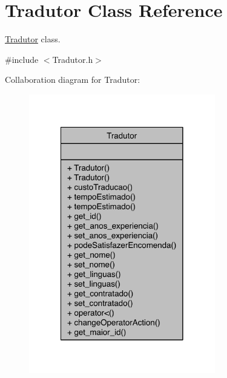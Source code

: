 \hypertarget{class_tradutor}{\section{Tradutor Class Reference}
\label{class_tradutor}
}


\hyperlink{class_tradutor}{Tradutor} class.  




{\ttfamily \#include $<$Tradutor.\-h$>$}



Collaboration diagram for Tradutor\-:
\nopagebreak
\begin{figure}[H]
\begin{center}
\leavevmode
\includegraphics[width=230pt]{class_tradutor__coll__graph}
\end{center}
\end{figure}
